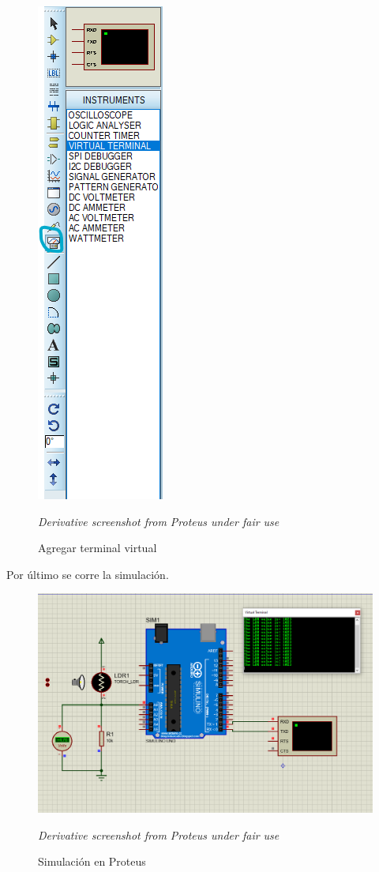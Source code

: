 \documentclass{article}
\begin{document}
\begin{figure}[H]
\centering
\includegraphics[width=0.1\paperwidth]{images/proteus-virtual-terminal.png}
\caption{Agregar terminal virtual}\footnotesize
\textit{Derivative screenshot from Proteus under fair use}
\end{figure}

Por último se corre la simulación.

\begin{figure}[H]
\centering
\includegraphics[width=0.3\paperwidth]{images/sim-1.png}
\caption{Simulación en Proteus}\footnotesize
\textit{Derivative screenshot from Proteus under fair use}
\end{figure}
\end{document}
